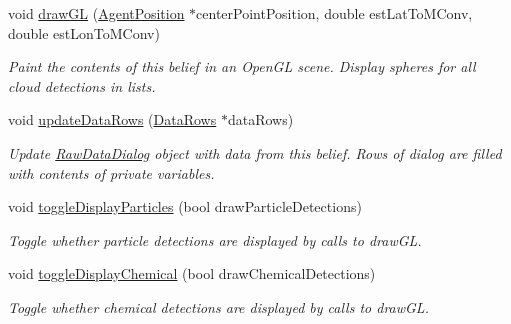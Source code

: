 \begin{DoxyCompactItemize}
void \hyperlink{class_cloud_detection_belief_ae726016b9e1146d02fb242a04989a944}{drawGL} (\hyperlink{class_agent_position}{AgentPosition} $\ast$centerPointPosition, double estLatToMConv, double estLonToMConv)
\begin{DoxyCompactList}\small\item\em Paint the contents of this belief in an OpenGL scene. Display spheres for all cloud detections in lists. \end{DoxyCompactList}\item 
void \hyperlink{class_cloud_detection_belief_aca53d51cdf1df9ff57bc0565967c78d4}{updateDataRows} (\hyperlink{struct_data_rows}{DataRows} $\ast$dataRows)
\begin{DoxyCompactList}\small\item\em Update \hyperlink{class_raw_data_dialog}{RawDataDialog} object with data from this belief. Rows of dialog are filled with contents of private variables. \end{DoxyCompactList}\item 
void \hyperlink{class_cloud_detection_belief_a468a6f4a6944e7aa913ff78335b47307}{toggleDisplayParticles} (bool drawParticleDetections)
\begin{DoxyCompactList}\small\item\em Toggle whether particle detections are displayed by calls to drawGL. \end{DoxyCompactList}\item 
void \hyperlink{class_cloud_detection_belief_a8ad53e97d8fca597c2c3d4f1b1337b83}{toggleDisplayChemical} (bool drawChemicalDetections)
\begin{DoxyCompactList}\small\item\em Toggle whether chemical detections are displayed by calls to drawGL. \end{DoxyCompactList}\end{DoxyCompactItemize}
